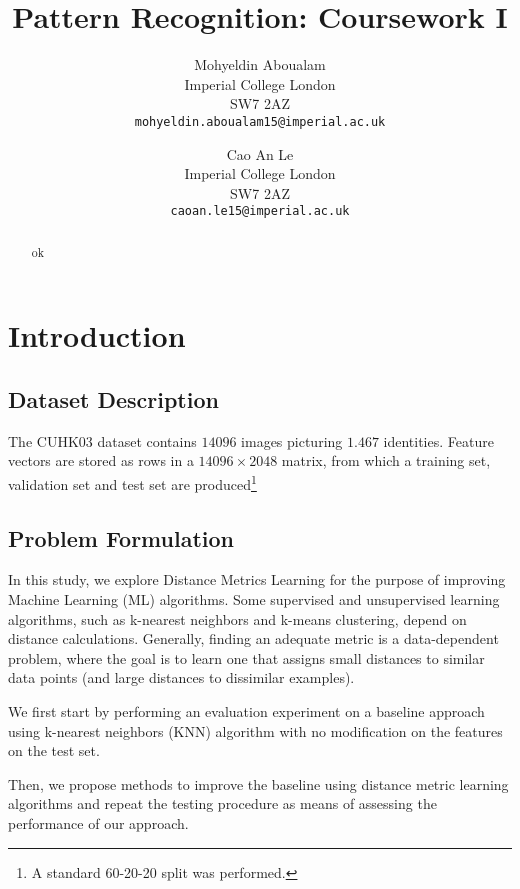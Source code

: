 \documentclass[10pt,twocolumn,letterpaper]{article}
\begin{document}
\title{Pattern Recognition: Coursework I}

\author{Mohyeldin Aboualam\\
Imperial College London\\
SW7 2AZ\\
{\tt\small mohyeldin.aboualam15@imperial.ac.uk}
\and
Cao An Le\\
Imperial College London\\
SW7 2AZ\\
{\tt\small caoan.le15@imperial.ac.uk}
}


\maketitle

\begin{abstract}
ok
\end{abstract}

\section{Introduction}
\subsection{Dataset Description}
The CUHK03 dataset contains $14096$ images picturing $1.467$ identities. Feature vectors are stored as rows in a $14096 \times 2048$ matrix, from which a training set, validation set and test set are produced\footnote{A standard 60-20-20 split was performed.}
\subsection{Problem Formulation}
In this study, we explore Distance Metrics Learning for the purpose of improving Machine Learning (ML) algorithms. Some supervised and unsupervised learning algorithms, such as k-nearest neighbors and k-means clustering, depend on distance calculations. Generally, finding an adequate metric is a data-dependent problem, where the goal is to learn one that assigns small distances to similar data points (and large distances to dissimilar examples).

We first start by performing an evaluation experiment on a baseline approach using k-nearest neighbors (KNN) algorithm with no modification on the features on the test set. 

Then, we propose methods to improve the baseline using distance metric learning algorithms and repeat the testing procedure as means of assessing the performance of our approach.
\end{document}
